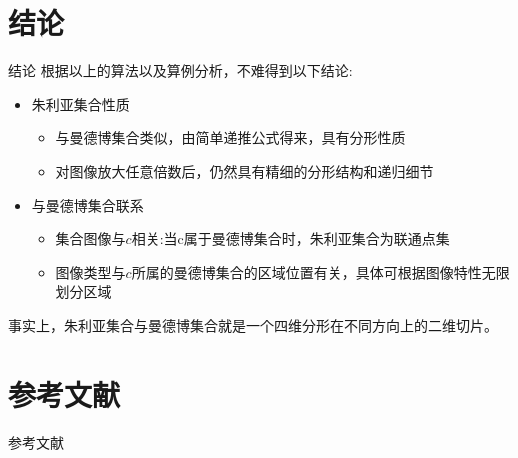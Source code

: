 \documentclass[8pt,c,compress,UTF8]{beamer}
\begin{document}
\section{结论}
\begin{frame}{结论}
根据以上的算法以及算例分析，不难得到以下结论:
\begin{itemize}
    \setlength{\itemsep}{2pt}
    \item 朱利亚集合性质
    \begin{itemize}
        \item 与曼德博集合类似，由简单递推公式得来，具有分形性质
        \item 对图像放大任意倍数后，仍然具有精细的分形结构和递归细节
    \end{itemize}
    \item 与曼德博集合联系
    \begin{itemize}
        \item 集合图像与$c$相关:当c属于曼德博集合时，朱利亚集合为联通点集
        \item 图像类型与$c$所属的曼德博集合的区域位置有关，具体可根据图像特性无限划分区域
    \end{itemize}
\end{itemize}
\par
事实上，朱利亚集合与曼德博集合就是一个四维分形在不同方向上的二维切片。
\end{frame}

\section{参考文献}

\begin{frame}{参考文献}
    
    \tiny
\end{frame}
\end{document}
